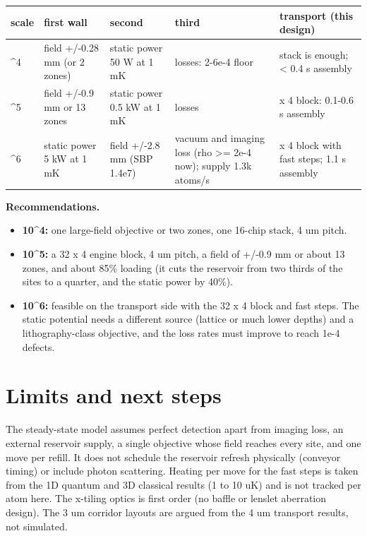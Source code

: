 {\footnotesize
\begin{longtable}[]{@{}>{\raggedright\arraybackslash}p{0.080\dimexpr(\linewidth-10\tabcolsep)\relax}>{\raggedright\arraybackslash}p{0.167\dimexpr(\linewidth-10\tabcolsep)\relax}>{\raggedright\arraybackslash}p{0.155\dimexpr(\linewidth-10\tabcolsep)\relax}>{\raggedright\arraybackslash}p{0.345\dimexpr(\linewidth-10\tabcolsep)\relax}>{\raggedright\arraybackslash}p{0.253\dimexpr(\linewidth-10\tabcolsep)\relax}@{}}
\toprule\noalign{}
scale & first wall & second & third & transport (this design) \\
\midrule\noalign{}
\endhead
\bottomrule\noalign{}
\endlastfoot
10\^{}4 & field +/-0.28 mm (or 2 zones) & static power 50 W at 1 mK &
losses: 2-6e-4 floor & 1 stack is enough; \textless{} 0.4 s assembly \\
10\^{}5 & field +/-0.9 mm or 13 zones & static power 0.5 kW at 1 mK &
losses & 32 x 4 block: 0.1-0.6 s assembly \\
10\^{}6 & static power 5 kW at 1 mK & field +/-2.8 mm (SBP 1.4e7) &
vacuum and imaging loss (rho \textgreater= 2e-4 now); supply 1.3k
atoms/s & 32 x 4 block with fast steps; 1.1 s assembly \\
\end{longtable}
}

\textbf{Recommendations.}

\begin{itemize}
\tightlist
\item
  \textbf{10\^{}4:} one large-field objective or two zones, one 16-chip
  stack, 4 um pitch.
\item
  \textbf{10\^{}5:} a 32 x 4 engine block, 4 um pitch, a field of +/-0.9
  mm or about 13 zones, and about 85\% loading (it cuts the reservoir
  from two thirds of the sites to a quarter, and the static power by
  40\%).
\item
  \textbf{10\^{}6:} feasible on the transport side with the 32 x 4 block
  and fast steps. The static potential needs a different source (lattice
  or much lower depths) and a lithography-class objective, and the loss
  rates must improve to reach 1e-4 defects.
\end{itemize}

\hypertarget{8-limits-and-next-steps}{%
\section{Limits and next steps}\label{megascale-8-limits-and-next-steps}}

The steady-state model assumes perfect detection apart from imaging
loss, an external reservoir supply, a single objective whose field
reaches every site, and one move per refill. It does not schedule the
reservoir refresh physically (conveyor timing) or include photon
scattering. Heating per move for the fast steps is taken from the 1D
quantum and 3D classical results (1 to 10 uK) and is not tracked per
atom here. The x-tiling optics is first order (no baffle or lenslet
aberration design). The 3 um corridor layouts are argued from the 4 um
transport results, not simulated.

